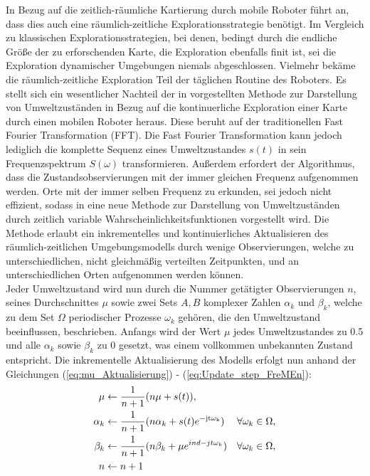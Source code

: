 In Bezug auf die zeitlich-räumliche Kartierung durch mobile Roboter führt \cite{Krajnik.2015} an, dass dies auch eine räumlich-zeitliche Explorationsstrategie benötigt. Im Vergleich zu klassischen Explorationsstrategien, bei denen, bedingt durch die endliche Größe der zu erforschenden Karte, die Exploration ebenfalls finit ist, sei die Exploration dynamischer Umgebungen niemals abgeschlossen. Vielmehr bekäme die räumlich-zeitliche Exploration Teil der täglichen Routine des Roboters.
Es stellt sich ein wesentlicher Nachteil der in \cite{Krajnik.2014} vorgestellten Methode zur Darstellung von Umweltzuständen in Bezug auf die kontinuerliche Exploration einer Karte durch einen mobilen Roboter heraus. Diese beruht auf der traditionellen Fast Fourier Transformation (FFT). Die Fast Fourier Transformation kann jedoch lediglich die komplette Sequenz eines Umweltzustandes $s(t)$ in sein Frequenzspektrum $S(\omega)$ transformieren. Außerdem erfordert der Algorithmus, dass die Zustandsobservierungen mit der immer gleichen Frequenz aufgenommen werden.  Orte mit der immer selben Frequenz zu erkunden, sei jedoch nicht effizient, sodass in \cite{Krajnik.2015} eine neue Methode zur Darstellung von Umweltzuständen durch zeitlich variable Wahrscheinlichkeitsfunktionen vorgestellt wird. Die Methode erlaubt ein inkrementelles und kontinuierliches Aktualisieren des räumlich-zeitlichen Umgebungsmodells durch wenige Observierungen, welche zu unterschiedlichen, nicht gleichmäßig verteilten Zeitpunkten, und an unterschiedlichen Orten aufgenommen werden können. \\
Jeder Umweltzustand wird nun durch die Nummer getätigter Observierungen $n$, seines Durchschnittes $\mu$ sowie zwei Sets $A,B$ komplexer Zahlen $\alpha_k$ und $\beta_k$, welche zu dem Set $\Omega$ periodischer Prozesse $\omega_k$ gehören, die den Umweltzustand beeinflussen, beschrieben. Anfangs wird der Wert $\mu$ jedes Umweltzustandes zu 0.5 und alle $\alpha_k$ sowie $\beta_k$ zu 0 gesetzt, was einem vollkommen unbekannten Zustand entspricht. Die inkrementelle Aktualisierung des Modells erfolgt nun anhand der Gleichungen (\ref{eq:mu_Aktualisierung}) - (\ref{eq:Update_step_FreMEn}):
\begin{align}
	\label{eq:mu_Aktualisierung}
	\mu &\leftarrow \frac{1}{n+1}(n \mu + s(t)), \\
	\alpha_k &\leftarrow \frac{1}{n+1} (n \alpha_k + s(t) e^{\mathrm{-jt\omega_k}})  &\forall \omega_k \in \Omega, \\
	\beta_k &\leftarrow \frac{1}{n+1} (n \beta_k + \mu e^{ind{-jt\omega_k}})  &\forall \omega_k \in \Omega, \\
	n &\leftarrow n + 1
	\label{eq:Update_step_FreMEn}
\end{align}
